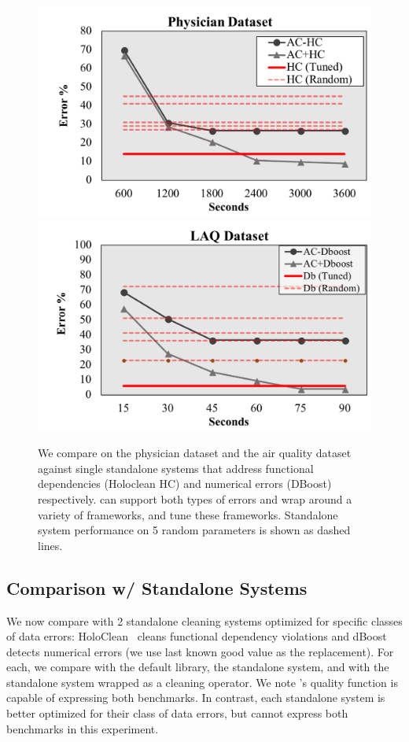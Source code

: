\begin{figure}[h]
\centering
 \includegraphics[width=0.7\columnwidth]{exp/exp9a.png}
 \includegraphics[width=0.7\columnwidth]{exp/exp9b.png}
 \caption{We compare \sys on the physician dataset and the air quality dataset against single standalone systems that address functional dependencies (Holoclean HC) and numerical errors (DBoost) respectively. \sys can support both types of errors and wrap around a variety of frameworks, and tune these frameworks.  Standalone system performance on 5 random parameters is shown as dashed lines.   \label{exp9}}
\end{figure}

\subsection{Comparison w/ Standalone Systems}
We now compare \sys with 2 standalone cleaning systems optimized for specific classes of data errors: HoloClean~\cite{rekatsinas2017holoclean} cleans functional dependency violations and dBoost~\cite{mariet2016outlier} detects numerical errors (we use last known good value as the replacement).  For each, we compare \sys with the default library, the standalone system, and \sys with the standalone system wrapped as a cleaning operator. We note \sys's quality function is capable of expressing both benchmarks.  In contrast, each standalone system is better optimized for their class of data errors, but cannot express both benchmarks in this experiment.

